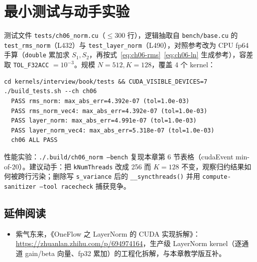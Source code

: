\section{最小测试与动手实验}

测试文件 \texttt{tests/\allowbreak{}ch06\_\allowbreak{}norm.\allowbreak{}cu}（$\le 300$ 行），逻辑抽取自 \texttt{bench/base.cu} 的 \texttt{test\_\allowbreak{}rms\_\allowbreak{}norm}（L432）与 \texttt{test\_\allowbreak{}layer\_\allowbreak{}norm}（L490），对照参考改为 CPU fp64 手算（\texttt{double} 累加求 $S_1, S_2$，再按式~\eqref{eq:ch06-rms}~\eqref{eq:ch06-ln} 生成参考），容差取 \texttt{TOL\_F32ACC} $= 10^{-3}$。规模 $N=512, K=128$，覆盖 4 个 kernel：

\begin{lstlisting}[style=console]
cd kernels/interview/book/tests && CUDA_VISIBLE_DEVICES=7 ./build_tests.sh --ch ch06
  PASS rms_norm: max_abs_err=4.392e-07 (tol=1.0e-03)
  PASS rms_norm_vec4: max_abs_err=4.392e-07 (tol=1.0e-03)
  PASS layer_norm: max_abs_err=4.991e-07 (tol=1.0e-03)
  PASS layer_norm_vec4: max_abs_err=5.318e-07 (tol=1.0e-03)
  ch06 ALL PASS
\end{lstlisting}

性能实验：\texttt{.\allowbreak{}/\allowbreak{}.\allowbreak{}build/\allowbreak{}ch06\_\allowbreak{}norm --bench} 复现本章第 6 节表格（cudaEvent min-of-20）。建议动手：把 \texttt{kNumThreads} 改成 256 而 $K=128$ 不变，观察归约结果如何被跨行污染；删除写 \texttt{s\_variance} 后的 \texttt{\_\allowbreak{}\_\allowbreak{}syncthreads\allowbreak{}()} 并用 \texttt{compute-sanitizer --tool racecheck} 捕获竞争。

\subsection*{延伸阅读}

\begin{itemize}
  \item 紫气东来，《OneFlow 之 LayerNorm 的 CUDA 实现拆解》：\url{https://zhuanlan.zhihu.com/p/694974164}，生产级 LayerNorm kernel（逐通道 gain/beta 向量、fp32 累加）的工程化拆解，与本章教学版互补。
\end{itemize}
